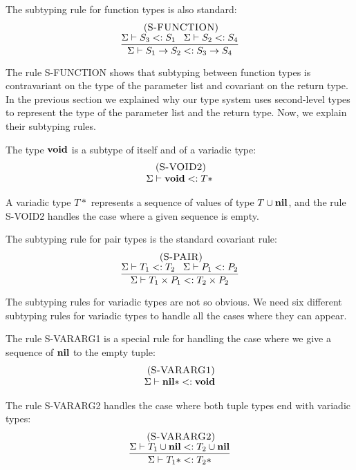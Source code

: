 The subtyping rule for function types is also standard:
\[
\begin{array}{c}
\; (\textsc{S-FUNCTION})\\
\dfrac{\Sigma \vdash S_{3} <: S_{1} \;\;\;
       \Sigma \vdash S_{2} <: S_{4}}
      {\Sigma \vdash S_{1} \rightarrow S_{2} <: S_{3} \rightarrow S_{4}}
\end{array}
\]

The rule \textsc{S-FUNCTION} shows that subtyping between
function types is contravariant on the type of the parameter list
and covariant on the return type.
In the previous section we explained why our type system uses
second-level types to represent the type of the parameter list
and the return type.
Now, we explain their subtyping rules.

The type $\mathbf{void}$ is a subtype of itself and of a variadic type:
\[
\begin{array}{c}
\; (\textsc{S-VOID2})\\
\Sigma \vdash \mathbf{void} <: T{*}
\end{array}
\]

A variadic type $T{*}$ represents a sequence of values of type
$T \cup \mathbf{nil}$, and the rule \textsc{S-VOID2} handles the case where
a given sequence is empty.

The subtyping rule for pair types is the standard covariant rule:
\[
\begin{array}{c}
\; (\textsc{S-PAIR})\\
\dfrac{\Sigma \vdash T_{1} <: T_{2} \;\;\;
       \Sigma \vdash P_{1} <: P_{2}}
      {\Sigma \vdash T_{1} \times P_{1} <: T_{2} \times P_{2}}
\end{array}
\]

The subtyping rules for variadic types are not so obvious.
We need six different subtyping rules for variadic types
to handle all the cases where they can appear.

The rule \textsc{S-VARARG1} is a special rule for handling the
case where we give a sequence of $\mathbf{nil}$ to the empty tuple:
\[
\begin{array}{c}
\; (\textsc{S-VARARG1})\\
\Sigma \vdash \mathbf{nil}{*} <: \mathbf{void}
\end{array}
\]

The rule \textsc{S-VARARG2} handles the case where both tuple types end
with variadic types:
\[
\begin{array}{c}
\; (\textsc{S-VARARG2})\\
\dfrac{\Sigma \vdash T_{1} \cup \mathbf{nil} <: T_{2} \cup \mathbf{nil}}
      {\Sigma \vdash T_{1}{*} <: T_{2}{*}}
\end{array}
\]

